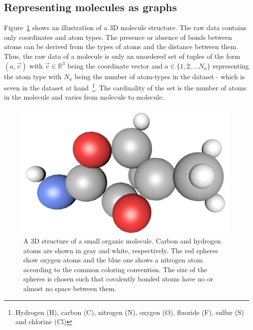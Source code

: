 
\subsection{Representing molecules as graphs}
\label{sec:molecules-as-graphs}

Figure~\ref{fig:molecule-3d} shows an illustration of a 3D molecule structure. The raw data contains only coordinates and atom types. The presence or absence of bonds between atoms can be derived from the types of atoms and the distance between them. Thus, the raw data of a molecule is only an unordered set of tuples of the form $(a, \vec{c})$
with $\vec{c} \in \mathbb{R}^3$ being the coordinate vector
and $a \in \{1, 2, ... N_a\} $ representing the atom type with $N_a$ being the number of atom-types in the dataset - which is seven in the dataset at hand~\footnote{
	Hydrogen (H), carbon (C), nitrogen (N), oxygen (O), fluoride (F), sulfur (S) and chlorine (Cl)
}. The cardinality of the set is the number of atoms in the molecule and varies from molecule to molecule.

\begin{figure}[H]
	\centering
	\includegraphics[width=\linewidth]{figures/molecule-3d-1}
	\caption{A 3D structure of a small organic molecule. Carbon and hydrogen atoms are shown in gray and white, respectively. The red spheres show oxygen atoms and the blue one shows a nitrogen atom according to the common coloring convention. The size of the spheres is chosen such that covalently bonded atoms have no or almost no space between them.
}
	\label{fig:molecule-3d}
\end{figure}

